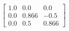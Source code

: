 \documentclass[preview]{standalone}
\begin{document}
\begin{align*}
\left[ \begin{array}{ccc}1.0 & 0.0 & 0.0 \\ 0.0 & 0.866 & -0.5 \\ 0.0 & 0.5 & 0.866\end{array} \right]
\end{align*}
\end{document}
